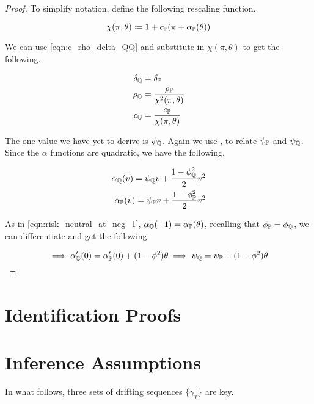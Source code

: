 \documentclass[11pt, letterpaper, twoside, final]{article}
\begin{document}
\begin{appendices}
\begin{proof}
To simplify notation, define the following rescaling function.

\begin{equation}
    \chi(\pi, \theta) \coloneqq 1 + c_{\mathbb{P}}(\pi + \alpha_{\mathbb{P}}(\theta))
\end{equation}

We can use \cref{eqn:c_rho_delta_QQ} and substitute in $\chi(\pi, \theta)$ to get the following.

\begin{align}
    \delta_{\mathbb{Q}} &= \delta_{\mathbb{P}} \\
    \rho_{\mathbb{Q}} &= \frac{\rho_{\mathbb{P}}}{\chi^2(\pi, \theta)} \\
    c_{\mathbb{Q}} &= \frac{c_{\mathbb{P}}}{\chi(\pi, \theta)} 
\end{align}

The one value we have yet to derive is $\psi_{\mathbb{Q}}$.
Again we use \textcite[Proposition 5]{khrapov2016affine}, to relate $\psi_{\mathbb{P}}$ and $\psi_{\mathbb{Q}}$. 
Since the $\alpha$ functions are quadratic, we have the following.

\begin{align}
    \alpha_{\QQ}(v) = \psi_{\QQ} v + \frac{1- \phi^2_{\QQ}}{2} v^2  \\
%
    \alpha_{\PP}(v) = \psi_{\PP} v + \frac{1- \phi^2_{\PP}}{2} v^2  
\end{align}

As in \cref{eqn:risk_neutral_at_neg_1}, $\alpha_{\mathbb{Q}}(-1) = \alpha_{\mathbb{P}}(\theta)$, recalling that $\phi_{\mathbb{P}} =
\phi_{\mathbb{Q}}$, we can differentiate and get the following.

\begin{align}
    \implies \alpha_{\QQ}'(0) = \alpha_{\PP}'(0) + (1 - \phi^2) \theta
%
    \implies \psi_{\QQ} = \psi_{\PP} + (1 - \phi^2) \theta
\end{align}

\end{proof}

\section{Identification Proofs}

\section{Inference Assumptions}

    In what follows, three sets of drifting sequences $\lbrace \gamma_T \rbrace$ are key. 
    

\end{appendices}
\end{document}
